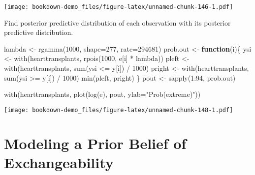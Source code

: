 \documentclass[
]{book}
\newenvironment{Shaded}{\begin{snugshade}}{\end{snugshade}}
\newcommand{\AttributeTok}[1]{\textcolor[rgb]{0.77,0.63,0.00}{#1}}
\newcommand{\ControlFlowTok}[1]{\textcolor[rgb]{0.13,0.29,0.53}{\textbf{#1}}}
\newcommand{\DecValTok}[1]{\textcolor[rgb]{0.00,0.00,0.81}{#1}}
\newcommand{\FunctionTok}[1]{\textcolor[rgb]{0.00,0.00,0.00}{#1}}
\newcommand{\NormalTok}[1]{#1}
\newcommand{\OtherTok}[1]{\textcolor[rgb]{0.56,0.35,0.01}{#1}}
\newcommand{\SpecialCharTok}[1]{\textcolor[rgb]{0.00,0.00,0.00}{#1}}
\newcommand{\StringTok}[1]{\textcolor[rgb]{0.31,0.60,0.02}{#1}}
\begin{document}
\texttt{[image: bookdown-demo\_files/figure-latex/unnamed-chunk-146-1.pdf]}

Find posterior predictive distribution of each observation with its posterior predictive distribution.

\begin{Shaded}
\begin{Highlighting}[]
\NormalTok{lambda }\OtherTok{\textless{}{-}} \FunctionTok{rgamma}\NormalTok{(}\DecValTok{1000}\NormalTok{, }\AttributeTok{shape=}\DecValTok{277}\NormalTok{, }\AttributeTok{rate=}\DecValTok{294681}\NormalTok{)}
\NormalTok{prob.out }\OtherTok{\textless{}{-}} \ControlFlowTok{function}\NormalTok{(i)\{}
\NormalTok{   ysi }\OtherTok{\textless{}{-}} \FunctionTok{with}\NormalTok{(hearttransplants,}
            \FunctionTok{rpois}\NormalTok{(}\DecValTok{1000}\NormalTok{, e[i] }\SpecialCharTok{*}\NormalTok{ lambda))}
\NormalTok{   pleft }\OtherTok{\textless{}{-}} \FunctionTok{with}\NormalTok{(hearttransplants,}
              \FunctionTok{sum}\NormalTok{(ysi }\SpecialCharTok{\textless{}=}\NormalTok{ y[i]) }\SpecialCharTok{/} \DecValTok{1000}\NormalTok{)}
\NormalTok{   pright }\OtherTok{\textless{}{-}} \FunctionTok{with}\NormalTok{(hearttransplants,}
               \FunctionTok{sum}\NormalTok{(ysi }\SpecialCharTok{\textgreater{}=}\NormalTok{ y[i]) }\SpecialCharTok{/} \DecValTok{1000}\NormalTok{)}
   \FunctionTok{min}\NormalTok{(pleft, pright)}
\NormalTok{ \}}
\NormalTok{pout }\OtherTok{\textless{}{-}} \FunctionTok{sapply}\NormalTok{(}\DecValTok{1}\SpecialCharTok{:}\DecValTok{94}\NormalTok{, prob.out)}
\end{Highlighting}
\end{Shaded}

\begin{Shaded}
\begin{Highlighting}[]
\FunctionTok{with}\NormalTok{(hearttransplants,}
     \FunctionTok{plot}\NormalTok{(}\FunctionTok{log}\NormalTok{(e), pout, }\AttributeTok{ylab=}\StringTok{"Prob(extreme)"}\NormalTok{))}
\end{Highlighting}
\end{Shaded}

\texttt{[image: bookdown-demo\_files/figure-latex/unnamed-chunk-148-1.pdf]}

\hypertarget{modeling-a-prior-belief-of-exchangeability}{%
\section{Modeling a Prior Belief of Exchangeability}\label{modeling-a-prior-belief-of-exchangeability}}
\end{document}
